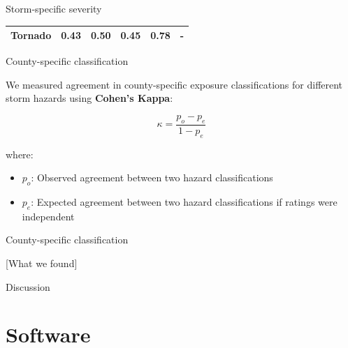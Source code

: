 \documentclass[ignorenonframetext,]{beamer}
\providecommand{\tightlist}{%
  \setlength{\itemsep}{0pt}\setlength{\parskip}{0pt}}
\begin{document}
\begin{frame}{Storm-specific severity}
\begin{longtable}[]{@{}cccccc@{}}
\begin{minipage}[t]{0.17\columnwidth}
\textbf{Tornado}\strut
\end{minipage} & \begin{minipage}[t]{0.13\columnwidth}\centering\strut
0.43\strut
\end{minipage} & \begin{minipage}[t]{0.08\columnwidth}\centering\strut
0.50\strut
\end{minipage} & \begin{minipage}[t]{0.08\columnwidth}\centering\strut
0.45\strut
\end{minipage} & \begin{minipage}[t]{0.09\columnwidth}\centering\strut
0.78\strut
\end{minipage} & \begin{minipage}[t]{0.10\columnwidth}\centering\strut
-\strut
\end{minipage}\tabularnewline
\bottomrule
\end{longtable}

\end{frame}

\begin{frame}{County-specific classification}

We measured agreement in county-specific exposure classifications for
different storm hazards using \textbf{Cohen's Kappa}:

\[
\kappa = \frac{p_{o} - p_{e}}{1 - p_{e}}
\]

where:

\begin{itemize}
\tightlist
\item
  \(p_o\): Observed agreement between two hazard classifications
\item
  \(p_e\): Expected agreement between two hazard classifications if
  ratings were independent
\end{itemize}

\end{frame}

\begin{frame}{County-specific classification}

{[}What we found{]}

\end{frame}

\begin{frame}{Discussion}

\end{frame}

\section{Software}\label{software}
\end{document}
